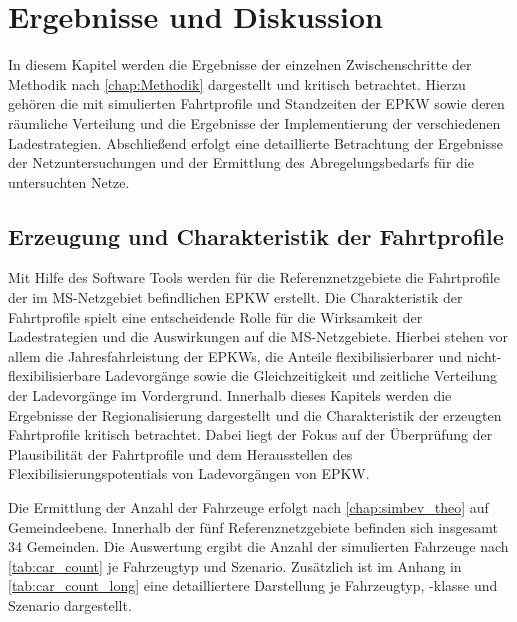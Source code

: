 \section{Ergebnisse und Diskussion}\label{chap:results}

In diesem Kapitel werden die Ergebnisse der einzelnen Zwischenschritte der Methodik nach \autoref{chap:Methodik} dargestellt und kritisch betrachtet.
Hierzu gehören die mit  simulierten Fahrtprofile und Standzeiten der \gls{EPKW} sowie deren räumliche Verteilung und die Ergebnisse der Implementierung der verschiedenen Ladestrategien.
Abschließend erfolgt eine detaillierte Betrachtung der Ergebnisse der Netzuntersuchungen und der Ermittlung des Abregelungsbedarfs für die untersuchten Netze.


\subsection{Erzeugung und Charakteristik der Fahrtprofile}

Mit Hilfe des Software Tools  werden für die Referenznetzgebiete die Fahrtprofile der im \gls{MS}-Netzgebiet befindlichen \gls{EPKW} erstellt.
Die Charakteristik der Fahrtprofile spielt eine entscheidende Rolle für die Wirksamkeit der Ladestrategien und die Auswirkungen auf die \gls{MS}-Netzgebiete.
Hierbei stehen vor allem die Jahresfahrleistung der \glspl{EPKW}, die Anteile flexibilisierbarer und nicht-flexibilisierbare Ladevorgänge sowie die Gleichzeitigkeit und zeitliche Verteilung der Ladevorgänge im Vordergrund.
Innerhalb dieses Kapitels werden die Ergebnisse der Regionalisierung dargestellt und die Charakteristik der erzeugten Fahrtprofile kritisch betrachtet.
Dabei liegt der Fokus auf der Überprüfung der Plausibilität der Fahrtprofile und dem Herausstellen des Flexibilisierungspotentials von Ladevorgängen von \gls{EPKW}.\medskip

Die Ermittlung der Anzahl der Fahrzeuge erfolgt nach \autoref{chap:simbev_theo} auf Gemeindeebene.
Innerhalb der fünf Referenznetzgebiete befinden sich insgesamt \num{34} Gemeinden.
Die Auswertung ergibt die Anzahl der simulierten Fahrzeuge nach \autoref{tab:car_count} je Fahrzeugtyp und Szenario.
Zusätzlich ist im Anhang in \autoref{tab:car_count_long} eine detailliertere Darstellung je Fahrzeugtyp, -klasse und Szenario dargestellt.



